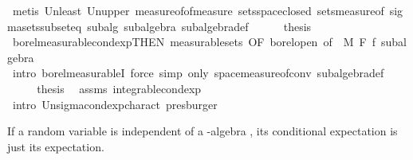 \begin{isabellebody}
\ {\isacharparenleft}{\kern0pt}metis\ Un{\isacharunderscore}{\kern0pt}least\ Un{\isacharunderscore}{\kern0pt}upper{}\ measure{\isacharunderscore}{\kern0pt}of{\isacharunderscore}{\kern0pt}of{\isacharunderscore}{\kern0pt}measure\ sets{\isachardot}{\kern0pt}space{\isacharunderscore}{\kern0pt}closed\ sets{\isacharunderscore}{\kern0pt}measure{\isacharunderscore}{\kern0pt}of\ sigma{\isacharunderscore}{\kern0pt}sets{\isacharunderscore}{\kern0pt}subseteq\ subalg\ subalgebra{\isacharparenleft}{\kern0pt}{}{\isacharparenright}{\kern0pt}\ subalgebra{\isacharunderscore}{\kern0pt}def{\isacharparenright}{\kern0pt}\isanewline
\ \ \ \ \isamarkupfalse%
\ {\isacharquery}{\kern0pt}thesis\ \isamarkupfalse%
\ borel{\isacharunderscore}{\kern0pt}measurable{\isacharunderscore}{\kern0pt}cond{\isacharunderscore}{\kern0pt}exp{\isacharbrackleft}{\kern0pt}THEN\ measurable{\isacharunderscore}{\kern0pt}sets{\isacharcomma}{\kern0pt}\ OF\ borel{\isacharunderscore}{\kern0pt}open{\isacharcomma}{\kern0pt}\ of\ {\isacharunderscore}{\kern0pt}\ M\ F\ f{\isacharbrackright}{\kern0pt}\ subalgebra\ \isamarkupfalse%
\ {\isacharparenleft}{\kern0pt}intro\ borel{\isacharunderscore}{\kern0pt}measurableI{\isacharcomma}{\kern0pt}\ force\ simp\ only{\isacharcolon}{\kern0pt}\ space{\isacharunderscore}{\kern0pt}measure{\isacharunderscore}{\kern0pt}of{\isacharunderscore}{\kern0pt}conv\ subalgebra{\isacharunderscore}{\kern0pt}def{\isacharparenright}{\kern0pt}\isanewline
\ \ \isamarkupfalse%
\isanewline
\ \ \isamarkupfalse%
\ \isamarkupfalse%
\ {\isacharquery}{\kern0pt}thesis\ \isamarkupfalse%
\ assms{\isacharparenleft}{\kern0pt}{}{\isacharparenright}{\kern0pt}\ integrable{\isacharunderscore}{\kern0pt}cond{\isacharunderscore}{\kern0pt}exp\ \isamarkupfalse%
\ {\isacharparenleft}{\kern0pt}intro\ Un{\isacharunderscore}{\kern0pt}sigma{\isachardot}{\kern0pt}cond{\isacharunderscore}{\kern0pt}exp{\isacharunderscore}{\kern0pt}charact{\isacharparenright}{\kern0pt}\ presburger{\isacharplus}{\kern0pt}\isanewline
{}\isamarkupfalse%
%
\endisatagproof
{\isafoldproof}%
%
\isadelimproof
%
\endisadelimproof
%
\begin{isamarkuptext}%
If a random variable is independent of a \isa{{\isasymsigma}}-algebra , its conditional expectation  is just its expectation.%
\end{isamarkuptext}\isamarkuptrue%
\isamarkupfalse%

\end{isabellebody}
